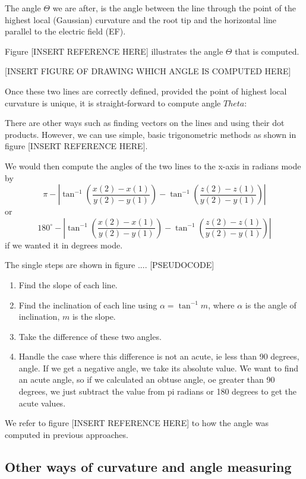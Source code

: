 The angle \( \Theta \) we are after, is the angle between the line through the point of the highest local (Gaussian) curvature and the root tip and the horizontal line parallel to the electric field (EF).  

Figure [INSERT REFERENCE HERE] illustrates the angle \( \Theta \) that is computed. 

[INSERT FIGURE OF DRAWING WHICH ANGLE IS COMPUTED HERE]

Once these two lines are correctly defined, provided the point of highest local curvature is unique, it is straight-forward to compute angle \( Theta \):

There are other ways such as finding vectors on the lines and using their dot products. However, we can use simple, basic trigonometric methods as shown in figure [INSERT REFERENCE HERE].

We would then compute the angles of the two lines to the x-axis  in radians mode by 
\[
\pi - | \tan^{-1}(\frac{x(2) - x(1)}{y(2) - y(1)}) - \tan^{-1}(\frac{z(2) - z(1)}{y(2) - y(1)}) |
\]
or 
\[
180^{\circ} - | \tan^{-1}(\frac{x(2) - x(1)}{y(2) - y(1)}) - \tan^{-1}(\frac{z(2) - z(1)}{y(2) - y(1)}) |
\]
if we wanted it in degrees mode.

The single steps are shown in figure ....
[PSEUDOCODE]
\begin{enumerate}
	\item Find the slope of each line.
	\item Find the inclination of each line using \( \alpha = \tan^{-1} m \), where  \( \alpha \) is the angle of inclination, \( m \) is the slope.
	\item Take the difference of these two angles.
	\item Handle the case where this difference is not an acute, ie less than 90 degrees, angle. If we get a negative angle, we take its absolute value. We want to find an acute angle, so if we calculated an obtuse angle, oe greater than 90 degrees, we just subtract the value from pi radians or 180 degrees to get the acute values.
\end{enumerate}


We refer to figure [INSERT REFERENCE HERE] to how the angle was computed in previous approaches. 


\subsection{Other ways of curvature and angle measuring}

